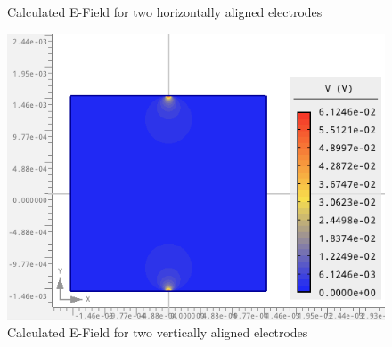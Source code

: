 \documentclass{article}
\begin{document}
\begin{figure}[htbp]
\begin{minipage}[b]{0.3\textwidth}
            \caption{Calculated E-Field for two horizontally aligned electrodes}
            \label{fig:FE_efield_horizontal}
        \end{minipage}
        \hfill
        \begin{minipage}[b]{0.3\textwidth}
            \includegraphics[width=\textwidth]{FE_efield_vertical}
            \caption{Calculated E-Field for two vertically aligned electrodes}
            \label{fig:FE_efield_vertical}
        \end{minipage}
    \end{figure}
\end{document}
